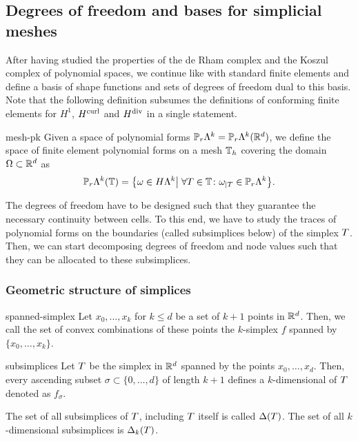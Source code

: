 \subsection{Degrees of freedom and bases for simplicial meshes}

\begin{intro}
  After having studied the properties of the de Rham complex and the
  Koszul complex of polynomial spaces, we continue like with standard
  finite elements and define a basis of shape functions and sets of
  degrees of freedom dual to this basis. Note that the following
  definition subsumes the definitions of conforming finite elements
  for $H^1$, $H^{\text{curl}}$ and $H^{\text{div}}$ in a single statement.
\end{intro}

\begin{Definition}{mesh-pk}
  Given a space of polynomial forms
  $\mathbb P_r\Lambda^k=\mathbb P_r\Lambda^k(\mathbb R^d)$, we define the space of finite
  element polynomial forms on a mesh $\mathbb T_h$ covering the domain
  $\Omega\subset\mathbb R^d$ as
  \begin{gather}
    \mathbb P_r\Lambda^k(\mathbb T) = \bigl\{
    \omega \in H\Lambda^k \big|
    \;\forall T\in\mathbb T\colon \omega_{|T} \in \mathbb P_r\Lambda^k
    \bigr\}.
  \end{gather}
\end{Definition}

\begin{intro}
  The degrees of freedom have to be designed such that they guarantee
  the necessary continuity between cells. To this end, we have to
  study the traces of polynomial forms on the boundaries (called
  subsimplices below) of the simplex $T$. Then, we can start
  decomposing degrees of freedom and node values such that they can be
  allocated to these subsimplices.
\end{intro}

\subsubsection{Geometric structure of simplices}

\begin{Definition}{spanned-simplex}
  Let $x_0,\dots,x_k$ for $k\le d$ be a set of $k+1$ points in
  $\mathbb R^d$. Then, we call the set of convex combinations of these points
  the $k$-simplex $f$ spanned by $\{x_0,\dots,x_k\}$.
\end{Definition}


\begin{Definition}{subsimplices}
  Let $T$ be the simplex in $\mathbb R^d$ spanned by the points
  $x_0,\dots,x_d$. Then, every ascending subset
  $\sigma \subset \{0,\dots,d\}$ of length $k+1$ defines a
  $k$-dimensional  of $T$ denoted as $f_\sigma$.

  The set of all subsimplices of $T$, including $T$ itself is
  called $\Delta(T)$. The set of all $k$-dimensional subsimplices
  is $\Delta_k(T)$.
\end{Definition}

